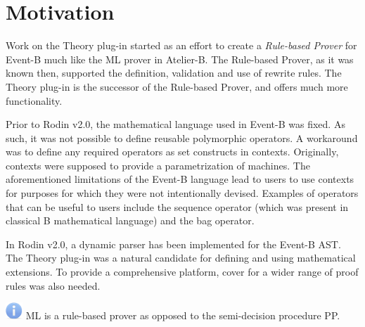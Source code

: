 \documentclass{article}      %
\begin{document}
\section{Motivation}
Work on the Theory plug-in started as an effort to create a \textit{Rule-based Prover} for Event-B much like the ML prover in Atelier-B. The Rule-based Prover, as it was known then, supported the definition, validation and use of rewrite rules. The Theory plug-in is the successor of the Rule-based Prover, and offers much more functionality.
\par 
Prior to Rodin v2.0, the mathematical language used in Event-B was fixed. As such, it was not possible to define reusable polymorphic operators. A workaround was to define any required operators as set constructs in contexts. Originally, contexts were supposed to provide a parametrization of machines. The aforementioned limitations of the Event-B language lead to users to use contexts for purposes for which they were not intentionally devised. Examples of operators that can be useful to users include the sequence operator (which was present in classical B mathematical language) and the bag operator.
\par
In Rodin v2.0, a dynamic parser has been implemented for the Event-B AST. The Theory plug-in was a natural candidate for defining and using mathematical extensions. To provide a comprehensive platform, cover for a wider range of proof rules was also needed.

\includegraphics{images/info.png} ML is a rule-based prover as opposed to the semi-decision procedure PP.
\end{document}
